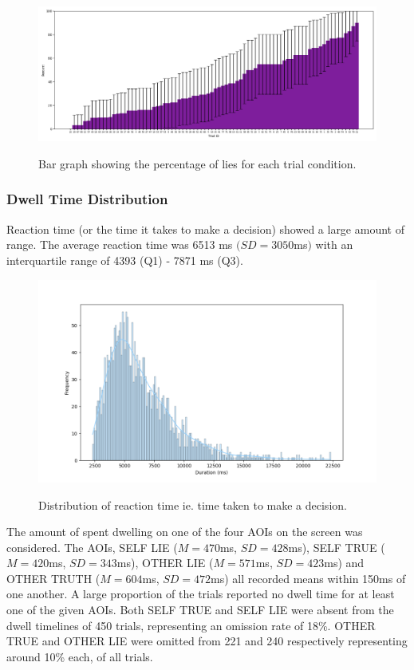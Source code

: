 \documentclass[man, floatsintext]{apa7}
\begin{document}
\begin{figure}[H]
	\includegraphics[width=\linewidth]{../plots/RESPONSE/TRIALIDPercentLies.png}
	\label{fig:TRIALIDPercentLies}
	\caption{Bar graph showing the percentage of lies for each trial condition.}
\end{figure}

\subsubsection{Dwell Time Distribution}

Reaction time (or the time it takes to make a decision) showed a large amount of range. The average reaction time was 6513 ms $(SD = 3050$ms$)$ with an interquartile range of 4393 (Q1) - 7871 ms (Q3).

\begin{figure}[H]
	\includegraphics[width=\linewidth]{../plots/Dwell/RTDistPlot.png}
	\label{fig:RTDistPlot}
	\caption{Distribution of reaction time ie. time taken to make a decision.}
\end{figure}

The amount of spent dwelling on one of the four AOIs on the screen was considered. The AOIs, SELF LIE ($M = 470$ms, $SD = 428$ms), SELF TRUE ($M = 420$ms, $SD = 343$ms), OTHER LIE ($M = 571$ms, $SD = 423$ms) and OTHER TRUTH ($M = 604$ms, $SD = 472$ms) all recorded means within 150ms of one another. A large proportion of the trials reported no dwell time for at least one of the given AOIs. Both SELF TRUE and SELF LIE were absent from the dwell timelines of 450 trials, representing an omission rate of 18\%. OTHER TRUE and OTHER LIE were omitted from 221 and 240 respectively representing around 10\% each, of all trials.
\end{document}
